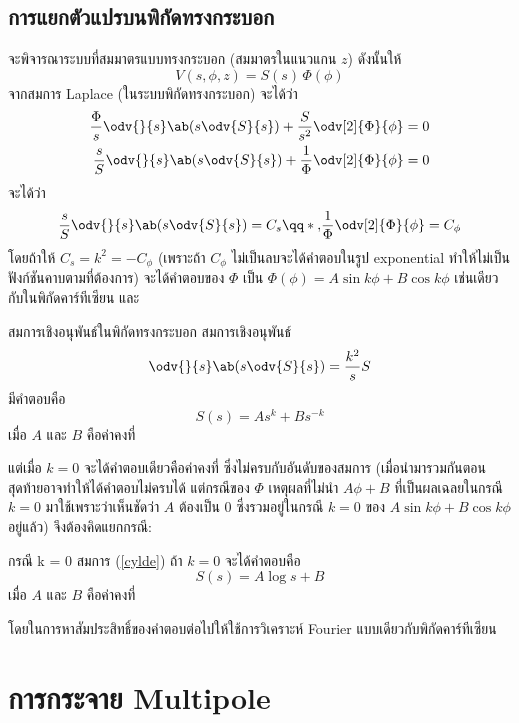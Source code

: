 \subsection{การแยกตัวแปรบนพิกัดทรงกระบอก}
จะพิจารณาระบบที่สมมาตรแบบทรงกระบอก (สมมาตรในแนวแกน $z$) ดังนั้นให้
\[
V(s,\phi,z)=S(s)\,\Phi(\phi)
\]
จากสมการ Laplace (ในระบบพิกัดทรงกระบอก) จะได้ว่า
\begin{align*}
    \frac{\Phi}{s}\odv{}{s}\ab(s\odv{S}{s})+\frac{S}{s^2}\odv[2]{\Phi}{\phi}&=0\\
    \frac{s}{S}\odv{}{s}\ab(s\odv{S}{s})+\frac{1}{\Phi}\odv[2]{\Phi}{\phi}&=0
\end{align*}
จะได้ว่า
\[
\frac{s}{S}\odv{}{s}\ab(s\odv{S}{s})=C_s\qq*{,}\frac{1}{\Phi}\odv[2]{\Phi}{\phi}=C_\phi
\]
โดยถ้าให้ $C_s=k^2=-C_\phi$ (เพราะถ้า $C_\phi$ ไม่เป็นลบจะได้คำตอบในรูป exponential ทำให้ไม่เป็นฟังก์ชันคาบตามที่ต้องการ) จะได้คำตอบของ $\Phi$ เป็น $\Phi(\phi)=A\sin k\phi+B\cos k\phi$ เช่นเดียวกับในพิกัดคาร์ทีเซียน และ
\begin{lawbox}{สมการเชิงอนุพันธ์ในพิกัดทรงกระบอก}
    สมการเชิงอนุพันธ์
    \begin{equation}
    \odv{}{s}\ab(s\odv{S}{s})=\frac{k^2}{s}S\label{cylde}
    \end{equation}
    มีคำตอบคือ
    \begin{equation}
        S(s)=As^k+Bs^{-k}
    \end{equation}
    เมื่อ $A$ และ $B$ คือค่าคงที่
\end{lawbox}
แต่เมื่อ $k=0$ จะได้คำตอบเดียวคือค่าคงที่ ซึ่งไม่ครบกับอันดับของสมการ (เมื่อนำมารวมกันตอนสุดท้ายอาจทำให้ได้คำตอบไม่ครบได้ แต่กรณีของ $\Phi$ เหตุผลที่ไม่นำ $A\phi+B$ ที่เป็นผลเฉลยในกรณี $k=0$ มาใช้เพราะว่าเห็นชัดว่า $A$ ต้องเป็น $0$ ซึ่งรวมอยู่ในกรณี $k=0$ ของ $A\sin k\phi + B\cos k\phi$ อยู่แล้ว) จึงต้องคิดแยกกรณี:
\begin{lawbox}{กรณี k = 0}
    สมการ (\ref{cylde}) ถ้า $k=0$ จะได้คำตอบคือ
    \begin{equation}
        S(s)=A\log s+B
    \end{equation}
    เมื่อ $A$ และ $B$ คือค่าคงที่
\end{lawbox}
โดยในการหาสัมประสิทธิ์ของคำตอบต่อไปให้ใช้การวิเคราะห์ Fourier แบบเดียวกับพิกัดคาร์ทีเซียน

\section{การกระจาย Multipole}
